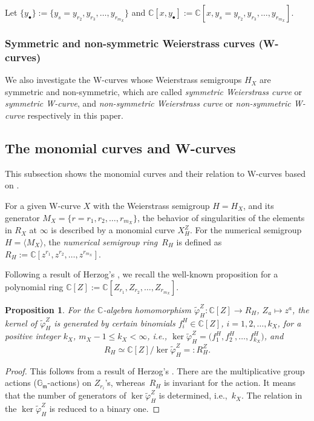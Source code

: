 \documentclass[pdftex]{sigma}
\def\CC{{\mathbb C}}
\def\GG{{\mathbb G}}
\def\fm{{\mathfrak m}}
\def\tvarphi{{\widetilde \varphi}}
\numberwithin{equation}{section}
\newtheorem{Proposition}[Theorem]{Proposition}
 { \theoremstyle{definition}
\newtheorem{Definition}[Theorem]{Definition}
\newtheorem{Note}[Theorem]{Note}
\newtheorem{Example}[Theorem]{Example}
\newtheorem{Remark}[Theorem]{Remark} }
\begin{document}
Let $\{y_{\bullet}\}:=\{y_{s}=y_{r_2}, y_{r_3}, \dots, y_{r_{m_X}}\}$ and $\CC[x, y_{\bullet}]:=\CC[x, y_{s}=y_{r_2}, y_{r_3}, \dots, y_{r_{m_X}}]$.

\subsubsection{Symmetric and non-symmetric Weierstrass curves (W-curves)}\label{2sssec:SymmWcurve}

We also investigate the W-curves whose Weierstrass semigroups $H_X$ are symmetric and non-symmetric, which are called {\emph{symmetric Weierstrass curve}} or {\emph{symmetric W-curve}}, and {\emph{non-symmetric Weierstrass curve}} or {\emph{non-symmetric W-curve}} respectively in this paper.

\subsection{The monomial curves and W-curves}\label{2ssc:MCurve}

This subsection shows the monomial curves and their relation to W-curves based on \cite{KM2020, KMP16, KMP19}.

For a given W-curve $X$ with the Weierstrass semigroup $H=H_X$, and its generator $M_X=\{r=r_1, r_2, \dots, r_{m_X}\}$, the behavior of singularities of the elements in $R_X$ at $\infty$ is described by a monomial curve $X_H^Z$.
For the numerical semigroup $H=\langle M_X\rangle$, the \emph{numerical semigroup ring}~$R_H$ is defined as $R_H:=\CC[ z^{r_1}, z^{r_2}, \dots, z^{r_{m_X}}]$.

Following a result of Herzog's \cite{Herzog70}, we recall the well-known proposition for a polynomial ring $\CC[Z]:=\CC[Z_{r_1}, Z_{r_2}, \dots, Z_{r_{m_X}}]$.
\begin{Proposition} \label{2pr:R_H}
For the $\CC$-algebra homomorphism $ \tvarphi^Z_H\colon \CC[Z] \to R_H$, $Z_a\mapsto z^a$, the kernel of $\tvarphi^Z_H$ is generated by certain binomials $f^H_i \in \CC[Z]$, $i=1,2,\dots,k_X$, for a positive integer $k_X$, $m_X-1\le k_X< \infty$, i.e., $\ker\tvarphi^Z_H=\big(f^H_1, f^H_2, \dots, f^H_{k_X}\big)$, and
\[
R_H \simeq \CC[Z]/ \ker\tvarphi^Z_H=:R^Z_H.
\]
\end{Proposition}

\begin{proof}This follows from a result of Herzog's \cite{Herzog70}.
There are the multiplicative group actions ($\GG_\fm$-actions) on $Z_{r_i}$'s, whereas~$R_H$ is invariant for the action.
It means that the number of generators of $\ker\tvarphi^Z_H$ is determined, i.e.,~$k_X$.
The relation in the $\ker\tvarphi^Z_H$ is reduced to a binary one.
\end{proof}
\end{document}

